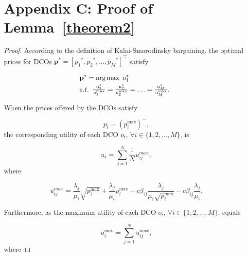 \documentclass[twocolumn,10pt]{IEEEtran}
\newtheorem{proof}{Proof}
\begin{document}
\section*{Appendix C: Proof of Lemma~\ref{theorem2}}
\begin{proof}
According to the definition of Kalai-Smorodinsky bargaining, the optimal prices for DCOs $\mathbf{p}^*=[{p_1}^*,{p_2}^*,\ldots,{p_M}^*]^\top$  satisfy


\begin{equation}\label{optinks}
    \begin{array}{l}
     \begin{gathered}
 \mathbf{p}^* = \arg \max {\kern 1pt} \,{\text{u}}_{1}^* \hfill\\
  s.t.  {\begin{array}{*{20}{l}}
  {\frac{{{\text{u}}_{1}^*  }}{{{\text{u}}_{1}^{\max }  }} = \frac{{{\text{u}}_{2}^*  }}{{{\text{u}}_{2}^{\max } }} = \ldots = \frac{{{\text{u}}_{M}^*  }}{{{\text{u}}_{M}^{\max }  }}}.
\end{array}}  \hfill
\end{gathered}
    \end{array}
\end{equation}

When the prices offered by the DCOs satisfy

\begin{equation}
    p_{i}= {\left({p_{i}^{\max }} \right)}^ -,
\end{equation}
the corresponding utility of each DCO $o_i$, $\forall i \in \{1,2, \ldots, M\}$, is

\begin{equation}
    u_i= {\sum\limits_{j = 1}^N \frac{1}{N}{u^{max}_{ij}} },
\end{equation}
where

\begin{equation}
u^{max}_{{i}j}={\frac{{{\lambda _j}}}{{{\mu _{i}}}}\sqrt {p_{i}^{\max }}  + \frac{{{\lambda _j}}}{{{\mu _{i}}}}p_{i}^{\max } - c{\beta _{{i}j}}\frac{{{\lambda _j}}}{{{\mu _{i}}\sqrt {p_{i}^{\max }} }} - c{\beta _{{i}j}}\frac{{{\lambda _j}}}{{{\mu _{i}}}}}.
\end{equation}

Furthermore, as the maximum utility of each DCO $o_i$, $\forall i \in \{1,2, \ldots, M\}$, equals

\begin{equation}
    {{u}}_{i}^{\max }= \sum\limits_{j = 1}^N {u^{max}_{ij}},
\end{equation}
where


\end{proof}
\end{document}
